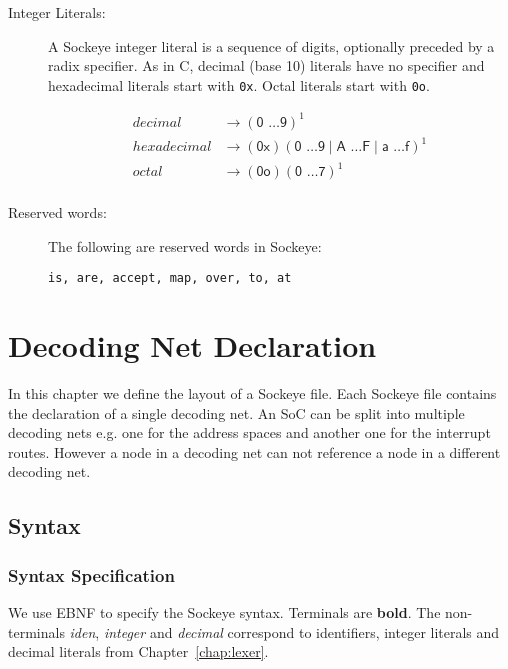 \documentclass[a4paper,11pt,twoside]{report}
\begin{document}
{{{\begin{description}
\item[Integer Literals:] A Sockeye integer literal is a sequence of
  digits, optionally preceded by a radix specifier.  As in C, decimal (base 10)
  literals have no specifier and hexadecimal literals start with
  \texttt{0x}. Octal literals start with \texttt{0o}.

\begin{align*}
decimal & \rightarrow (\textsf{0 \ldots 9})^{\textrm{1}}\\
hexadecimal & \rightarrow (\textsf{0x})(\textsf{0 \ldots 9} \mid \textsf{A \ldots F} \mid \textsf{a \ldots f})^{\textrm{1}}\\
octal & \rightarrow (\textsf{0o})(\textsf{0 \ldots 7})^{\textrm{1}}\\
\end{align*}

\item[Reserved words:] The following are reserved words in Sockeye:
\begin{verbatim}
is, are, accept, map, over, to, at
\end{verbatim}

\end{description}


\chapter{Decoding Net Declaration}
\label{chap:declaration}

In this chapter we define the layout of a Sockeye file. Each Sockeye file contains the declaration of a single decoding net.
An SoC can be split into multiple decoding nets e.g. one for the address spaces and another one for the interrupt routes.
However a node in a decoding net can not reference a node in a different decoding net.

\section{Syntax}

\subsection{Syntax Specification}
We use EBNF to specify the Sockeye syntax. Terminals are \textbf{bold}.
The non-terminals \textit{iden}, \textit{integer} and \textit{decimal} correspond to identifiers, integer literals and decimal literals from Chapter~\ref{chap:lexer}.

}}}
\end{document}
